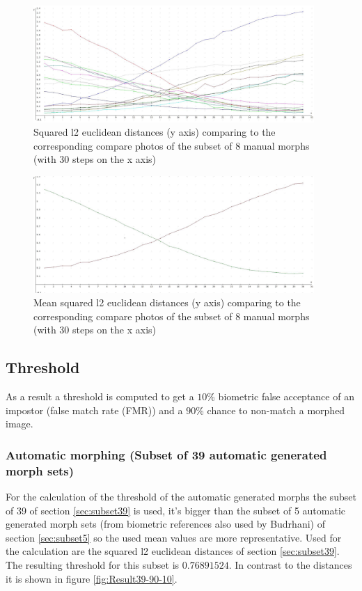 \begin{figure}[htbp] 
	\centering
		\includegraphics[width=0.95\textwidth]{Resources/result-jannis.jpg}
	\caption{Squared l2 euclidean distances (y axis) comparing to the corresponding compare photos of the subset of 8 manual morphs (with 30 steps on the x axis)}
	\label{fig:result-jannis-all}
\end{figure}
\begin{figure}[htbp] 
	\centering
		\includegraphics[width=0.95\textwidth]{Resources/result-jannis-mean}
	\caption{Mean squared l2 euclidean distances (y axis) comparing to the corresponding compare photos of the subset of 8 manual morphs (with 30 steps on the x axis)}
	\label{fig:result-jannis-mean}
\end{figure}

\subsection{Threshold}
\label{Threshold}
As a result a threshold is computed to get a $10$\% biometric false acceptance of an impostor (false match rate (FMR)) and a $90$\% chance to non-match a morphed image.

\subsubsection{Automatic morphing (Subset of 39 automatic generated morph sets)}\label{sec:automorph-thres}
For the calculation of the threshold of the automatic generated morphs the subset of 39 of section \ref{sec:subset39} is used, it's bigger than the subset of 5 automatic generated morph sets (from biometric references also used by Budrhani) of section \ref{sec:subset5} so the used mean values are more representative.
Used for the calculation are the squared l2 euclidean distances of section \ref{sec:subset39}.
The resulting threshold for this subset is \textbf{$0.76891524$}. In contrast to the distances it is shown in figure \ref{fig:Result39-90-10}.


